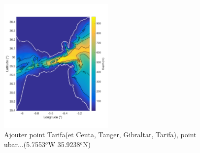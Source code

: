 
\begin{figure}[!h]
        \includegraphics[width=0.5\textwidth]{./GBR3D/FigBathyVHR.png}
        \caption{Ajouter point Tarifa(et Ceuta, Tanger, Gibraltar, Tarifa), point ubar...(5.7553$^o$W  35.9238$^o$N)}
\end{figure}



